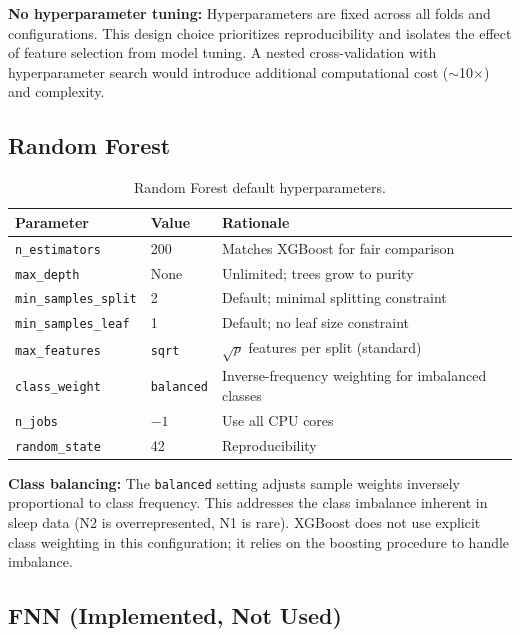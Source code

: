 \textbf{No hyperparameter tuning:} Hyperparameters are fixed across all folds and configurations. This design choice prioritizes reproducibility and isolates the effect of feature selection from model tuning. A nested cross-validation with hyperparameter search would introduce additional computational cost ($\sim$10$\times$) and complexity.

\subsection{Random Forest}

\begin{table}[h]
\centering
\caption{Random Forest default hyperparameters.}
\label{tab:rf_params}
\begin{tabular}{l l l}
\toprule
\textbf{Parameter} & \textbf{Value} & \textbf{Rationale} \\
\midrule
\texttt{n\_estimators}      & 200            & Matches XGBoost for fair comparison \\
\texttt{max\_depth}         & None           & Unlimited; trees grow to purity \\
\texttt{min\_samples\_split} & 2             & Default; minimal splitting constraint \\
\texttt{min\_samples\_leaf}  & 1             & Default; no leaf size constraint \\
\texttt{max\_features}      & \texttt{sqrt}  & $\sqrt{p}$ features per split (standard) \\
\texttt{class\_weight}      & \texttt{balanced} & Inverse-frequency weighting for imbalanced classes \\
\texttt{n\_jobs}            & $-1$           & Use all CPU cores \\
\texttt{random\_state}      & 42             & Reproducibility \\
\bottomrule
\end{tabular}
\end{table}

\textbf{Class balancing:} The \texttt{balanced} setting adjusts sample weights inversely proportional to class frequency. This addresses the class imbalance inherent in sleep data (N2 is overrepresented, N1 is rare). XGBoost does not use explicit class weighting in this configuration; it relies on the boosting procedure to handle imbalance.

\subsection{FNN (Implemented, Not Used)}

